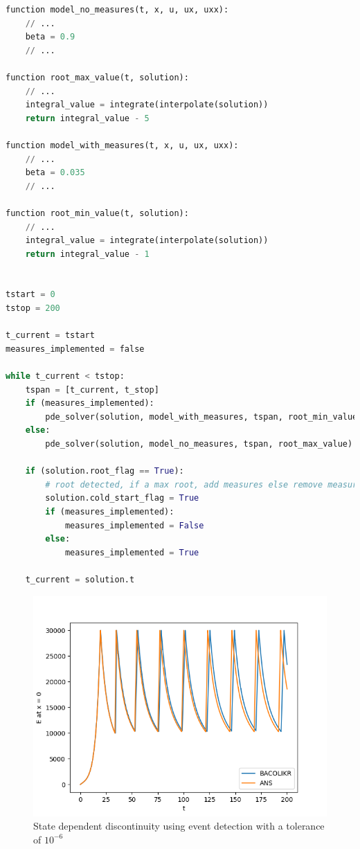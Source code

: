 \documentclass{article}
\begin{document}
\begin{minipage}{\linewidth}
\begin{lstlisting}[language=Python]
function model_no_measures(t, x, u, ux, uxx):
	// ...
	beta = 0.9
	// ...
	
function root_max_value(t, solution):
	// ...
	integral_value = integrate(interpolate(solution))
	return integral_value - 5
	
function model_with_measures(t, x, u, ux, uxx):
	// ...
	beta = 0.035
	// ...
	
function root_min_value(t, solution):
	// ...
	integral_value = integrate(interpolate(solution))
	return integral_value - 1


tstart = 0
tstop = 200
		
t_current = tstart
measures_implemented = false

while t_current < tstop:
	tspan = [t_current, t_stop]
	if (measures_implemented):
		pde_solver(solution, model_with_measures, tspan, root_min_value)
	else:
		pde_solver(solution, model_no_measures, tspan, root_max_value)
		
	if (solution.root_flag == True):
		# root detected, if a max root, add measures else remove measures
		solution.cold_start_flag = True
		if (measures_implemented):
			measures_implemented = False
		else:
			measures_implemented = True
		
	t_current = solution.t

\end{lstlisting}
\end{minipage}


\begin{figure}[H]
\centering
\includegraphics[width=0.7\linewidth]{./figures/pde_state_disc_event_tol_6}
\caption{State dependent discontinuity using event detection with a tolerance of $10^{-6}$}
\label{fig:pde_state_disc_event_tol_6}
\end{figure}
\end{document}
